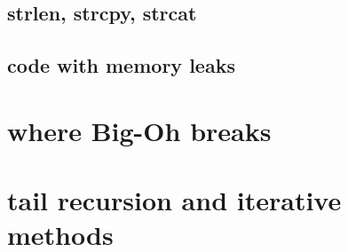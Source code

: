 \subsection{strlen, strcpy, strcat}



\subsection{code with memory leaks}





\section{where Big-Oh breaks}



\section{tail recursion and iterative methods}



